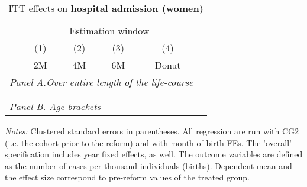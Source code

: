  \begin{table}[H] \centering 
 	\begin{threeparttable} \centering \caption{ITT effects on \textbf{hospital admission (women)}}\label{tab: DD_hopsital2_female} {\def\sym#1{\ifmmode^{#1}\else\(^{#1}\)\fi} 
 			\begin{tabular}{l*{5}{c}}
 				\toprule 
 				& \multicolumn{4}{c}{Estimation window} \\ 
 				\cmidrule(lr){2-5}
 				&\multicolumn{1}{c}{(1)}&\multicolumn{1}{c}{(2)}&\multicolumn{1}{c}{(3)}&\multicolumn{1}{c}{(4)}\\
 				&\multicolumn{1}{c}{2M}&\multicolumn{1}{c}{4M}&\multicolumn{1}{c}{6M}&\multicolumn{1}{c}{Donut}\\
 				\midrule
 				\multicolumn{5}{l}{\emph{Panel A.Over entire length of the life-course}} \\
 				 \\ \\
 				\multicolumn{5}{l}{\emph{Panel B. Age brackets}} \\
 				    
 				\bottomrule 
 		\end{tabular}}
 		\begin{tablenotes} 
 			\item \scriptsize \emph{Notes:} Clustered standard errors in parentheses. All regression are run with CG2 (i.e. the cohort prior to the reform) and with month-of-birth FEs. The 'overall' specification includes year fixed effects, as well. The outcome variables are defined as the number of cases per thousand individuals (births). Dependent mean and the effect size correspond to pre-reform values of the treated group.
 		\end{tablenotes} 
 	\end{threeparttable} 
 \end{table}